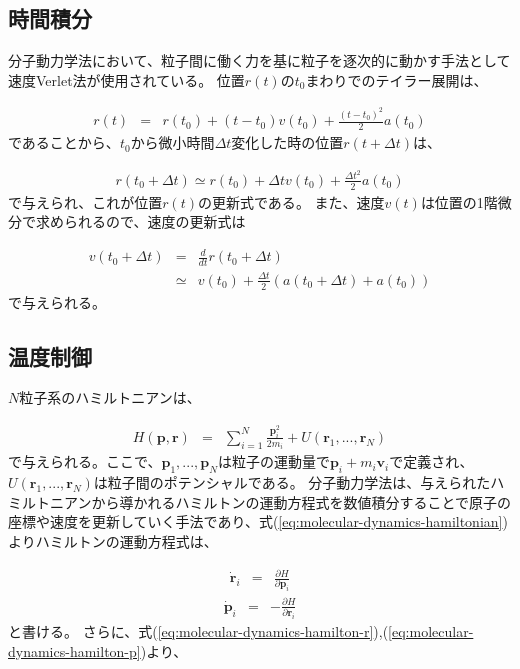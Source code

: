 \documentclass[titlepage]{jsreport}
\begin{document}
\subsection{時間積分}\label{principle-subsec:time-integral}
分子動力学法において、粒子間に働く力を基に粒子を逐次的に動かす手法として速度Verlet法が使用されている。
位置$r(t)$の$t_0$まわりでのテイラー展開は、

\large
\begin{eqnarray}
r(t) &=& r(t_0)+(t-t_0)v(t_0)+\frac{(t-t_0)^2}{2}a(t_0) \label{eq:taylor}
\end{eqnarray}
\normalsize
であることから、$t_0$から微小時間$\Delta{t}$変化した時の位置$r(t+\Delta{t})$は、

\large
\begin{eqnarray}
r(t_0+\Delta{t}) \simeq r(t_0)+\Delta{t}v(t_0)+\frac{\Delta{t}^2}{2}a(t_0) \label{eq:r-renewal-formula}
\end{eqnarray}
\normalsize
で与えられ、これが位置$r(t)$の更新式である\cite{velocity-verlet}。
また、速度$v(t)$は位置の1階微分で求められるので、速度の更新式は

\large
\begin{eqnarray}
v(t_0+\Delta{t}) &=& \frac{d}{dt}r(t_0+\Delta{t}) \nonumber \\
&\simeq& v(t_0)+\frac{\Delta{t}}{2}(a(t_0+\Delta{t})+a(t_0)) \label{eq:v-renewal-formula}
\end{eqnarray}
\normalsize
で与えられる。

\subsection{温度制御}\label{principle-subsec:temperature-control}
$N$粒子系のハミルトニアンは、

\large
\begin{eqnarray}
H(\mathbf{p},\mathbf{r}) &=& \sum_{i=1}^N\frac{\mathbf{p}_i^2}{2m_i}+U(\mathbf{r}_1,...,\mathbf{r}_N) \label{eq:molecular-dynamics-hamiltonian}
\end{eqnarray}
\normalsize
で与えられる\cite{molecular-dynamics-hamiltonian}。ここで、$\mathbf{p}_1,...,\mathbf{p}_N$は粒子の運動量で$\mathbf{p}_i+m_i\mathbf{v}_i$で定義され、$U(\mathbf{r}_1,...,\mathbf{r}_N)$は粒子間のポテンシャルである。
分子動力学法は、与えられたハミルトニアンから導かれるハミルトンの運動方程式を数値積分することで原子の座標や速度を更新していく手法であり、式(\ref{eq:molecular-dynamics-hamiltonian})よりハミルトンの運動方程式は、

\large
\begin{eqnarray}
\dot{\mathbf{r}}_i &=& \frac{\partial H}{\partial \mathbf{p}_i} \label{eq:molecular-dynamics-hamilton-r}
\end{eqnarray}
\normalsize
\large
\begin{eqnarray}
\dot{\mathbf{p}}_i &=& -\frac{\partial H}{\partial \mathbf{r}_i} \label{eq:molecular-dynamics-hamilton-p}
\end{eqnarray}
\normalsize
と書ける。
さらに、式(\ref{eq:molecular-dynamics-hamilton-r}),(\ref{eq:molecular-dynamics-hamilton-p})より、
\end{document}
